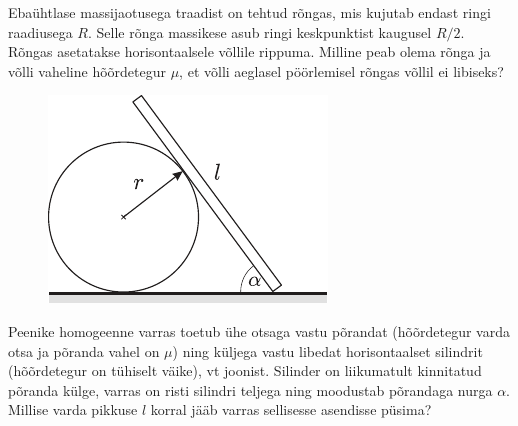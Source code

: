 \documentclass[10pt]{article}
\begin{document}
{%

Ebaühtlase massijaotusega traadist on tehtud rõngas, mis kujutab endast ringi raadiusega $R$. Selle rõnga massikese asub ringi keskpunktist
kaugusel $R/2$. Rõngas asetatakse horisontaalsele võllile rippuma. Milline peab
olema rõnga ja võlli vaheline hõõrdetegur $\mu$, et võlli aeglasel pöörlemisel rõngas
võllil ei libiseks?
\probend
\bigskip


\begin{figure}
	\begin{center}
		\vspace{-25pt}
		\includegraphics[width=\linewidth]{2008-v3g-09-yl}
	\end{center}
\end{figure}
Peenike homogeenne varras toetub ühe otsaga vastu põrandat (hõõrdetegur varda otsa ja põranda vahel on $\mu$) ning küljega vastu libedat horisontaalset silindrit (hõõrdetegur on tühiselt väike), vt joonist. Silinder on liikumatult kinnitatud põranda külge, varras on risti silindri teljega ning moodustab põrandaga nurga $\alpha$. Millise varda pikkuse $l$ korral jääb varras sellisesse asendisse püsima?
\probend
\bigskip


}
\end{document}
